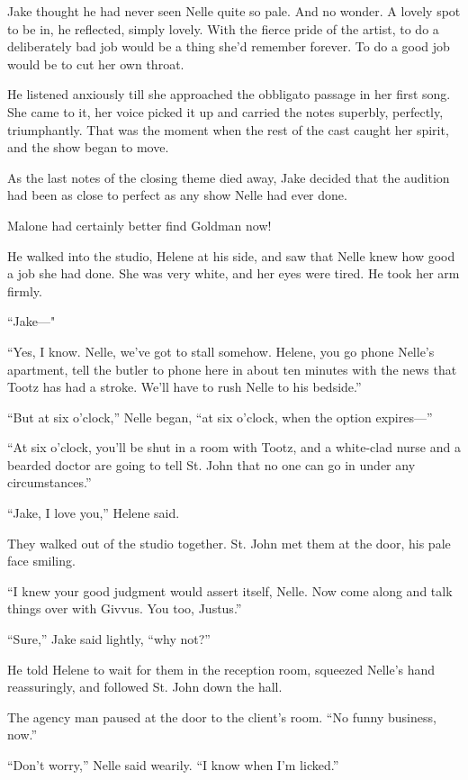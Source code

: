 \documentclass{novel}
\begin{document}
Jake thought he had never seen Nelle quite so pale. And no wonder. A lovely spot to be in, he reflected, simply lovely. With the fierce pride of the artist, to do a deliberately bad job would be a thing she’d remember forever. To do a good job would be to cut her own throat.

He listened anxiously till she approached the obbligato passage in her first song. She came to it, her voice picked it up and carried the notes superbly, perfectly, triumphantly. That was the moment when the rest of the cast caught her spirit, and the show began to move.

As the last notes of the closing theme died away, Jake decided that the audition had been as close to perfect as any show Nelle had ever done.

Malone had certainly better find Goldman now!

He walked into the studio, Helene at his side, and saw that Nelle knew how good a job she had done. She was very white, and her eyes were tired. He took her arm firmly.

“Jake—"

“Yes, I know. Nelle, we’ve got to stall somehow. Helene, you go phone Nelle’s apartment, tell the butler to phone here in about ten minutes with the news that Tootz has had a stroke. We’ll have to rush Nelle to his bedside.”

“But at six o’clock,” Nelle began, “at six o’clock, when the option expires—”

“At six o’clock, you’ll be shut in a room with Tootz, and a white-clad nurse and a bearded doctor are going to tell St. John that no one can go in under any circumstances.”

“Jake, I love you,” Helene said.

They walked out of the studio together. St. John met them at the door, his pale face smiling.

“I knew your good judgment would assert itself, Nelle. Now come along and talk things over with Givvus. You too, Justus.”

“Sure,” Jake said lightly, “why not?”

He told Helene to wait for them in the reception room, squeezed Nelle’s hand reassuringly, and followed St. John down the hall.

The agency man paused at the door to the client’s room. “No funny business, now.”

“Don’t worry,” Nelle said wearily. “I know when I’m licked.”
\end{document}
